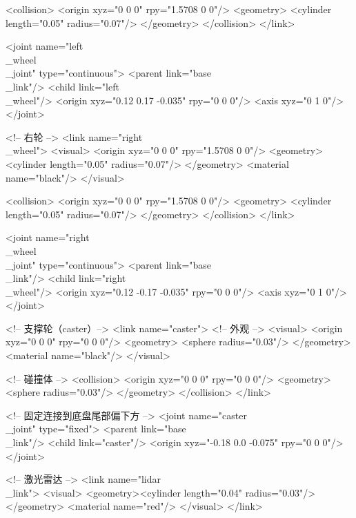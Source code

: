 \documentclass[a4paper,12pt]{book}
\begin{document}
{    <collision>
      <origin xyz="0 0 0" rpy="1.5708 0 0"/>
      <geometry>
        <cylinder length="0.05" radius="0.07"/>
      </geometry>
    </collision>
  </link>

  <joint name="left\\_wheel\\_joint" type="continuous">
    <parent link="base\\_link"/>
    <child link="left\\_wheel"/>
    <origin xyz="0.12 0.17 -0.035" rpy="0 0 0"/>
    <axis xyz="0 1 0"/>
  </joint>

  <!-- 右轮 -->
  <link name="right\\_wheel">
    <visual>
      <origin xyz="0 0 0" rpy="1.5708 0 0"/>
      <geometry>
        <cylinder length="0.05" radius="0.07"/>
      </geometry>
      <material name="black"/>
    </visual>

    <collision>
      <origin xyz="0 0 0" rpy="1.5708 0 0"/>
      <geometry>
        <cylinder length="0.05" radius="0.07"/>
      </geometry>
    </collision>
  </link>

  <joint name="right\\_wheel\\_joint" type="continuous">
    <parent link="base\\_link"/>
    <child link="right\\_wheel"/>
    <origin xyz="0.12 -0.17 -0.035" rpy="0 0 0"/>
    <axis xyz="0 1 0"/>
  </joint>

<!-- 支撑轮（caster）-->
  <link name="caster">
    <!-- 外观 -->
    <visual>
      <origin xyz="0 0 0" rpy="0 0 0"/>
      <geometry>
        <sphere radius="0.03"/>
      </geometry>
      <material name="black"/>
    </visual>

    <!-- 碰撞体 -->
    <collision>
      <origin xyz="0 0 0" rpy="0 0 0"/>
      <geometry>
        <sphere radius="0.03"/>
      </geometry>
    </collision>
  </link>

  <!-- 固定连接到底盘尾部偏下方 -->
  <joint name="caster\\_joint" type="fixed">
    <parent link="base\\_link"/>
    <child link="caster"/>
    <origin xyz="-0.18 0.0 -0.075" rpy="0 0 0"/>
  </joint>

  <!-- 激光雷达 -->
  <link name="lidar\\_link">
    <visual>
      <geometry><cylinder length="0.04" radius="0.03"/></geometry>
      <material name="red"/>
    </visual>
  </link>

}
\end{document}
